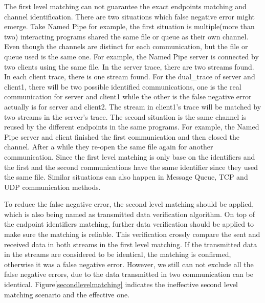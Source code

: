 The first level matching can not guarantee the exact endpoints matching and channel identification. There are two situations which false negative error might emerge. Take Named Pipe for example, the first situation is multiple(more than two) interacting programs shared the same file or queue as their own channel. Even though the channels are distinct for each communication, but the file or queue used is the same one. For example, the Named Pipe server is connected by two clients using the same file. In the server trace, there are two streams found. In each client trace, there is one stream found. For the dual\_trace of server and client1, there will be two possible identified communications, one is the real communication for server and client1 while the other is the false negative error actually is for server and client2. The stream in client1's trace will be matched by two streams in the server's trace. The second situation is the same channel is reused by the different endpoints in the same programs. For example, the Named Pipe server and client finished the first communication and then closed the channel. After a while they re-open the same file again for another communication. Since the first level matching is only base on the identifiers and the first and the second communications have the same identifier since they used the same file. Similar situations can also happen in Message Queue, TCP and UDP communication methods. 

To reduce the false negative error, the second level matching should be applied, which is also being named as transmitted data verification algorithm. On top of the endpoint identifiers matching, further data verification should be applied to make sure the matching is reliable. This verification crossly compare the sent and received data in both streams in the first level matching. If the transmitted data in the streams are considered to be identical, the matching is confirmed, otherwise it was a false negative error. However, we still can not exclude all the false negative errors, due to the data transmitted in two communication can be identical. Figure\ref{secondlevelmatching} indicates the ineffective second level matching scenario and the effective one.

